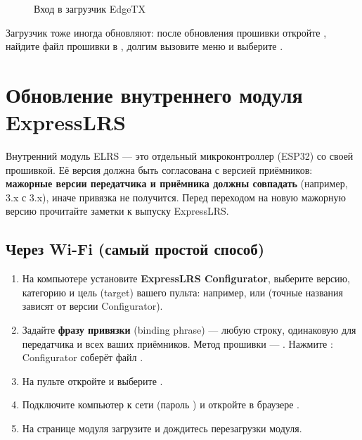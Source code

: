 \begin{figure}[H]
\centering
{}
\caption{Вход в загрузчик EdgeTX}
\end{figure}

Загрузчик тоже иногда обновляют: после обновления прошивки откройте ,
найдите файл прошивки в , долгим  вызовите меню и выберите
.

\section{Обновление внутреннего модуля ExpressLRS}
\label{sec:elrs-update}

Внутренний модуль ELRS --- это отдельный микроконтроллер (ESP32) со своей прошивкой.
Её версия должна быть согласована с версией приёмников: \textbf{мажорные версии передатчика и
приёмника должны совпадать} (например, 3.x с 3.x), иначе привязка не получится. Перед
переходом на новую мажорную версию прочитайте заметки к выпуску ExpressLRS.

\subsection{Через Wi-Fi (самый простой способ)}

\begin{enumerate}
  \item На компьютере установите \textbf{ExpressLRS Configurator}, выберите версию,
        категорию  и цель (target) вашего пульта: например,
         или 
        (точные названия зависят от версии Configurator).
  \item Задайте \textbf{фразу привязки} (binding phrase) --- любую строку, одинаковую для
        передатчика и всех ваших приёмников. Метод прошивки --- . Нажмите
        : Configurator соберёт файл .
  \item На пульте откройте  и выберите
        .
  \item Подключите компьютер к сети  (пароль ) и
        откройте в браузере .
  \item На странице модуля загрузите  и дождитесь перезагрузки модуля.
\end{enumerate}

